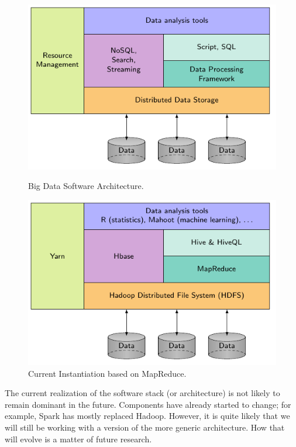 \documentclass[11pt]{article}
\begin{document}
\begin{figure}[h]
	\centering
	\begin{minipage}{.5\textwidth}
		\centering
		\includegraphics[width=\linewidth]{letters/Figures/big-architecture}
		\caption{Big Data Software Architecture.}
		\label{fig:bigdata}
	\end{minipage}%
	\begin{minipage}{.5\textwidth}
		\centering
		\includegraphics[width=\linewidth]{letters/Figures/Hadoop-stack}
		\caption{Current Instantiation based on MapReduce.}
		\label{fig:hadoop}
	\end{minipage}
	\label{fig:test}
\end{figure}

The current realization of the software stack (or architecture) is not likely to remain dominant in the future. Components have already started to change; for example, Spark has mostly replaced Hadoop. However, it is quite likely that we will still be working with a version of the more generic architecture. How that will evolve is a matter of future research.
\end{document}
